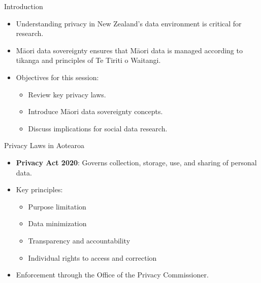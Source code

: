 \documentclass[
  12pt,
  ignorenonframetext,
]{beamer}
\providecommand{\tightlist}{%
  \setlength{\itemsep}{0pt}\setlength{\parskip}{0pt}}\usepackage{longtable,booktabs,array}
\begin{document}
\begin{frame}{Introduction}
\label{introduction}
\begin{itemize}
\tightlist
\item
  Understanding privacy in New Zealand's data environment is critical
  for research.
\item
  Māori data sovereignty ensures that Māori data is managed according to
  tikanga and principles of Te Tiriti o Waitangi.
\item
  Objectives for this session:

  \begin{itemize}
  \tightlist
  \item
    Review key privacy laws.
  \item
    Introduce Māori data sovereignty concepts.
  \item
    Discuss implications for social data research.
  \end{itemize}
\end{itemize}
\end{frame}

\begin{frame}{Privacy Laws in Aotearoa}
\label{privacy-laws-in-aotearoa}
\begin{itemize}
\tightlist
\item
  \textbf{Privacy Act 2020}: Governs collection, storage, use, and
  sharing of personal data.
\item
  Key principles:

  \begin{itemize}
  \tightlist
  \item
    Purpose limitation
  \item
    Data minimization
  \item
    Transparency and accountability
  \item
    Individual rights to access and correction
  \end{itemize}
\item
  Enforcement through the Office of the Privacy Commissioner.
\end{itemize}
\end{frame}
\end{document}
